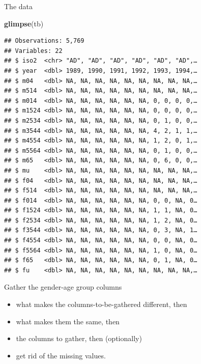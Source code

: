 \documentclass[ignorenonframetext,]{beamer}
\newenvironment{Shaded}{\begin{snugshade}}{\end{snugshade}}
\newcommand{\DataTypeTok}[1]{\textcolor[rgb]{0.13,0.29,0.53}{#1}}
\newcommand{\KeywordTok}[1]{\textcolor[rgb]{0.13,0.29,0.53}{\textbf{#1}}}
\newcommand{\NormalTok}[1]{#1}
\newcommand{\OperatorTok}[1]{\textcolor[rgb]{0.81,0.36,0.00}{\textbf{#1}}}
\newcommand{\StringTok}[1]{\textcolor[rgb]{0.31,0.60,0.02}{#1}}
\providecommand{\tightlist}{%
  \setlength{\itemsep}{0pt}\setlength{\parskip}{0pt}}
\begin{document}
\begin{frame}[fragile]{The data}
\protect\hypertarget{the-data-3}{}

\begin{Shaded}
\begin{Highlighting}[]
\KeywordTok{glimpse}\NormalTok{(tb)}
\end{Highlighting}
\end{Shaded}

\begin{verbatim}
## Observations: 5,769
## Variables: 22
## $ iso2  <chr> "AD", "AD", "AD", "AD", "AD", "AD",…
## $ year  <dbl> 1989, 1990, 1991, 1992, 1993, 1994,…
## $ m04   <dbl> NA, NA, NA, NA, NA, NA, NA, NA, NA,…
## $ m514  <dbl> NA, NA, NA, NA, NA, NA, NA, NA, NA,…
## $ m014  <dbl> NA, NA, NA, NA, NA, NA, 0, 0, 0, 0,…
## $ m1524 <dbl> NA, NA, NA, NA, NA, NA, 0, 0, 0, 0,…
## $ m2534 <dbl> NA, NA, NA, NA, NA, NA, 0, 1, 0, 0,…
## $ m3544 <dbl> NA, NA, NA, NA, NA, NA, 4, 2, 1, 1,…
## $ m4554 <dbl> NA, NA, NA, NA, NA, NA, 1, 2, 0, 1,…
## $ m5564 <dbl> NA, NA, NA, NA, NA, NA, 0, 1, 0, 0,…
## $ m65   <dbl> NA, NA, NA, NA, NA, NA, 0, 6, 0, 0,…
## $ mu    <dbl> NA, NA, NA, NA, NA, NA, NA, NA, NA,…
## $ f04   <dbl> NA, NA, NA, NA, NA, NA, NA, NA, NA,…
## $ f514  <dbl> NA, NA, NA, NA, NA, NA, NA, NA, NA,…
## $ f014  <dbl> NA, NA, NA, NA, NA, NA, 0, 0, NA, 0…
## $ f1524 <dbl> NA, NA, NA, NA, NA, NA, 1, 1, NA, 0…
## $ f2534 <dbl> NA, NA, NA, NA, NA, NA, 1, 2, NA, 0…
## $ f3544 <dbl> NA, NA, NA, NA, NA, NA, 0, 3, NA, 1…
## $ f4554 <dbl> NA, NA, NA, NA, NA, NA, 0, 0, NA, 0…
## $ f5564 <dbl> NA, NA, NA, NA, NA, NA, 1, 0, NA, 0…
## $ f65   <dbl> NA, NA, NA, NA, NA, NA, 0, 1, NA, 0…
## $ fu    <dbl> NA, NA, NA, NA, NA, NA, NA, NA, NA,…
\end{verbatim}

\end{frame}

\begin{frame}[fragile]{Gather the gender-age group columns}
\protect\hypertarget{gather-the-gender-age-group-columns}{}

\begin{Shaded}
\end{Shaded}

\begin{itemize}
\tightlist
\item
  what makes the columns-to-be-gathered different, then
\item
  what makes them the same, then
\item
  the columns to gather, then (optionally)
\item
  get rid of the missing values.
\end{itemize}

\end{frame}
\end{document}
